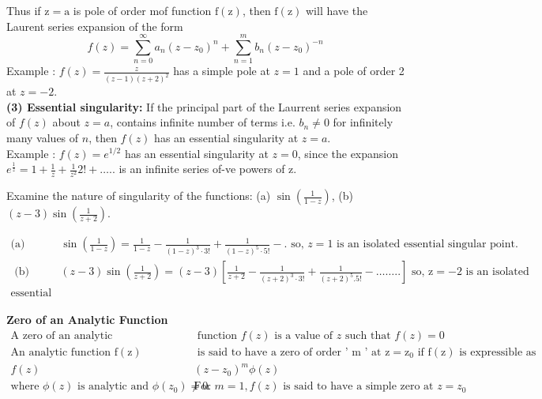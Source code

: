 Thus if $\mathrm{z}=\mathrm{a}$ is pole of order mof function $\mathrm{f}(\mathrm{z})$, then $\mathrm{f}(\mathrm{z})$ will have the Laurent series expansion of the form
$$
f(z)=\sum_{n=0}^{\infty} a_{n}\left(z-z_{0}\right)^{n}+\sum_{n=1}^{m} b_{n}\left(z-z_{0}\right)^{-n}
$$
Example : $f(z)=\frac{z}{(z-1)(z+2)^{2}}$ has a simple pole at $z=1$ and a pole of order 2 at $z=-2$.\\
\textbf{(3) Essential singularity: }If the principal part of the Laurrent series expansion of $f(z)$ about $z=a$, contains infinite number of terms i.e. $b_{n} \neq 0$ for infinitely many values of $n$, then $f(z)$ has an essential singularity at $z=a$.\\
Example : $f(z)=e^{1 / 2}$ has an essential singularity at $z=0$, since the expansion $e^{\frac{1}{z}}=1+\frac{1}{z}+\frac{1}{z^{2}} 2 !+\ldots . .$ is an infinite series of-ve powers of $\mathrm{z}$.\\
\begin{exercise}
	Examine the nature of singularity of the functions: (a) $\sin \left(\frac{1}{1-z}\right)$, (b) $(z-3) \sin \left(\frac{1}{z+2}\right)$.
\end{exercise}
\begin{answer}
	\begin{align*}
	\text{(a) }&\sin \left(\frac{1}{1-z}\right)=\frac{1}{1-z}-\frac{1}{(1-z)^{3} \cdot 3 !}+\frac{1}{(1-z)^{5} \cdot 5 !}-.
\text{	so, $z=1$ is an isolated essential singular point.}\\
\text { (b) }&(z-3) \sin \left(\frac{1}{z+2}\right)=(z-3)\left[\frac{1}{z+2}-\frac{1}{(z+2)^{3} \cdot 3 !}+\frac{1}{(z+2)^{5} .5 !}-\ldots \ldots . .\right] \text { so, } \mathrm{z}=-2 \text { is an isolated }\\
\text{essential point}
	\end{align*}
\end{answer}
\textbf{Zero of an Analytic Function}\\
\begin{align*}
\text{A zero of an analytic}&\text{ function $f(z)$ is a value of $z$ such that $f(z)=0$}\\
\text{An analytic function $\mathrm{f}(\mathrm{z})$}&\text{ is said to have a zero of order ' $\mathrm{m}$ ' at $\mathrm{z}=\mathrm{z}_{0}$ if $\mathrm{f}(\mathrm{z})$ is expressible as}\\
f(z)&\left(z-z_{0}\right)^{m} \phi(z)\\
\text{where $\phi(z)$ is analytic and $\phi\left(z_{0}\right) \neq 0$. }&\text{For $m=1, f(z)$ is said to have a simple zero at $z=z_{0}$}
\end{align*}
